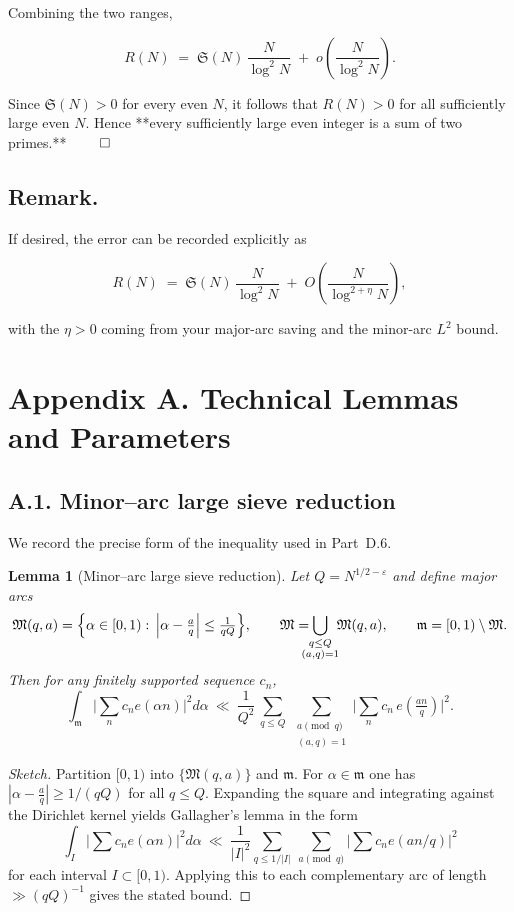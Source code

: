 \documentclass[11pt]{article}
\newtheorem{lemma}{Lemma}[section]
\theoremstyle{definition}
\theoremstyle{remark}
\begin{document}
Combining the two ranges,

$$
R(N)
\;=\;\mathfrak S(N)\,\frac{N}{\log^2 N}\;+\;o\!\left(\frac{N}{\log^2 N}\right).
$$

Since $\mathfrak S(N)>0$ for every even $N$, it follows that $R(N)>0$ for all sufficiently large even $N$. Hence **every sufficiently large even integer is a sum of two primes.** $\qed$

\subsection*{Remark.} 
If desired, the error can be recorded explicitly as

$$
R(N)\;=\;\mathfrak S(N)\,\frac{N}{\log^2 N}\;+\;O\!\left(\frac{N}{\log^{2+\eta}N}\right),
$$

with the $\eta>0$ coming from your major-arc saving and the minor-arc $L^2$ bound.

\section*{Appendix A. Technical Lemmas and Parameters}

\subsection*{A.1. Minor--arc large sieve reduction}

We record the precise form of the inequality used in Part~D.6.

\begin{lemma}[Minor--arc large sieve reduction]\label{lem:largesieve-minor}
Let $Q=N^{1/2-\varepsilon}$ and define major arcs
\[
\mathfrak M(q,a)=\Bigl\{\alpha\in[0,1):\,\Big|\alpha-\tfrac{a}{q}\Big|\le \tfrac{1}{qQ}\Bigr\},
\qquad \mathfrak M=\!\!\!\!\!\bigcup_{\substack{q\le Q\\ (a,q)=1}}\!\!\mathfrak M(q,a),
\qquad \mathfrak m=[0,1)\setminus\mathfrak M.
\]
Then for any finitely supported sequence $c_n$,
\[
\int_{\mathfrak m}\Big|\sum_{n}c_n e(\alpha n)\Big|^2 d\alpha
\ \ll\ \frac{1}{Q^2}\,
\sum_{q\le Q}\ \sum_{\substack{a\!\!\!\pmod q\\ (a,q)=1}}
\Big|\sum_{n} c_n\,e\!\left(\tfrac{an}{q}\right)\Big|^2.
\]
\end{lemma}

\begin{proof}[Sketch]
Partition $[0,1)$ into $\{\mathfrak M(q,a)\}$ and $\mathfrak m$. For $\alpha\in\mathfrak m$ one has
$|\alpha-\tfrac aq|\ge 1/(qQ)$ for all $q\le Q$. Expanding the square and integrating against the Dirichlet kernel yields Gallagher’s lemma in the form
\[
\int_{I} \Big|\sum c_n e(\alpha n)\Big|^2 d\alpha
\ \ll\ \frac{1}{|I|^2}\sum_{q\le 1/|I|}\ \sum_{a\pmod q}\Big|\sum c_n e(an/q)\Big|^2
\]
for each interval $I\subset[0,1)$. Applying this to each complementary arc of length $\gg (qQ)^{-1}$ gives the stated bound. 
\end{proof}
\end{document}
